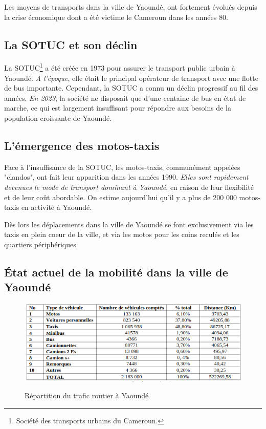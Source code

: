 \documentclass{article}
\begin{document}
Les moyens de transports dans la ville de Yaoundé, ont fortement évolués depuis la crise économique dont a été victime le Cameroun dans les années 80. 

\subsection{La SOTUC et son déclin}

La SOTUC\footnote{Société des transports urbains du Cameroun.
} a été créée en 1973 pour assurer le transport public urbain à Yaoundé. \emph{A l'époque}, elle était le principal opérateur de transport avec une flotte de bus importante. Cependant, la SOTUC a connu un déclin progressif au fil des années. \emph{En 2023}, la société ne disposait que d'une centaine de bus en état de marche, ce qui est largement insuffisant pour répondre aux besoins de la population croissante de Yaoundé.

\subsection{L'émergence des motos-taxis}

Face à l'insuffisance de la SOTUC, les motos-taxis, communément appelées "clandos", ont fait leur apparition dans les années 1990. \emph{Elles sont rapidement devenues le mode de transport dominant à Yaoundé}, en raison de leur flexibilité et de leur coût abordable. On estime aujourd'hui qu'il y a plus de 200 000 motos-taxis en activité à Yaoundé.

Dès lors les déplacements dans la ville de Yaoundé se font exclusivement via les taxis en plein coeur de la ville, et via les motos pour les coins reculés et les quartiers périphériques.

\subsection{État actuel de la mobilité dans la ville de Yaoundé}
\begin{figure}[h]
    \centering
    \includegraphics[width=0.8\linewidth]{Images/Repartition_Trafic_Par_Vehicule.png}
    \caption{Répartition du trafic routier à Yaoundé}
    \label{fig:repartition_trafic}
    \cite{mfoulou2016mobilite}
\end{figure}
\end{document}
